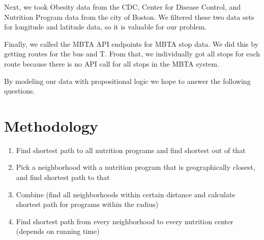 \documentclass[12pt]{article}
\begin{document}
Next, we took Obesity data from the CDC, Center for Disease Control, and Nutrition Program data from the city of Boston. We filtered these two data sets for longitude and latitude data, so it is valuable for our problem.

Finally, we called the MBTA API endpoints for MBTA stop data. We did this by getting routes for the bus and T. From that, we individually got all stops for each route because there is no API call for all stops in the MBTA system. 

 By modeling our data with propositional logic we hope to answer the following questions. 

 \section{Methodology}

\begin{enumerate}
\item Find shortest path to all nutrition programs and find shortest out of that
\item Pick a neighborhood with a nutrition program that is geographically closest, and find shortest path to that
\item Combine (find all neighborhoods within certain distance and calculate shortest path for programs within the radius)
\item Find shortest path from every neighborhood to every nutrition center (depends on running time)
\end{enumerate}
\end{document}
